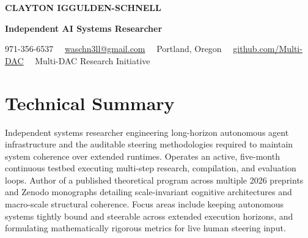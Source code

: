 \documentclass[10pt]{article}
\begin{document}
{\Huge\bfseries CLAYTON IGGULDEN-SCHNELL}\par
\vspace{3pt}
{\large\bfseries\color{accent}Independent AI Systems Researcher}\par
\vspace{4pt}
{\small 971-356-6537 \ \textbar\ \href{mailto:waschn3ll@gmail.com}{waschn3ll@gmail.com} \ \textbar\ Portland, Oregon \ \textbar\ \href{https://github.com/Multi-DAC}{github.com/Multi-DAC} \ \textbar\ Multi-DAC Research Initiative}\par

\section{Technical Summary}
Independent systems researcher engineering long-horizon autonomous agent infrastructure and the auditable steering methodologies required to maintain system coherence over extended runtimes. Operates an active, five-month continuous testbed executing multi-step research, compilation, and evaluation loops. Author of a published theoretical program across multiple 2026 preprints and Zenodo monographs detailing scale-invariant cognitive architectures and macro-scale structural coherence. Focus areas include keeping autonomous systems tightly bound and steerable across extended execution horizons, and formulating mathematically rigorous metrics for live human steering input.
\end{document}
